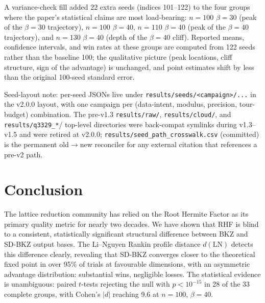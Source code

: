 \documentclass[journal=cic,version=preprint]{iacrj}
\begin{document}
A variance-check fill added 22 extra seeds (indices 101--122) to the four groups where the paper's statistical claims are most load-bearing: $n=100$ $\beta=30$ (peak of the $\beta=30$ trajectory), $n=100$ $\beta=40$, $n=110$ $\beta=40$ (peak of the $\beta=40$ trajectory), and $n=130$ $\beta=40$ (depth of the $\beta=40$ cliff). Reported means, confidence intervals, and win rates at these groups are computed from 122 seeds rather than the baseline 100; the qualitative picture (peak locations, cliff structure, sign of the advantage) is unchanged, and point estimates shift by less than the original 100-seed standard error.

Seed-layout note: per-seed JSONs live under \texttt{results/seeds/<campaign>/...} in the v2.0.0 layout, with one campaign per (data-intent, modulus, precision, tour-budget) combination. The pre-v1.3 \texttt{results/raw/}, \texttt{results/cloud/}, and \texttt{results/q3329\_*}/ top-level directories were back-compat symlinks during v1.3--v1.5 and were retired at v2.0.0; \texttt{results/seed\_path\_crosswalk.csv} (committed) is the permanent old$\to$new reconciler for any external citation that references a pre-v2 path.

\section{Conclusion}
\label{sec:conclusion}

The lattice reduction community has relied on the Root Hermite Factor as its primary quality metric for nearly two decades. We have shown that RHF is blind to a consistent, statistically significant structural difference between BKZ and SD-BKZ output bases. The Li--Nguyen Rankin profile distance $d(\mathrm{LN})$ detects this difference clearly, revealing that SD-BKZ converges closer to the theoretical fixed point in over 95\% of trials at favourable dimensions, with an asymmetric advantage distribution: substantial wins, negligible losses. The statistical evidence is unambiguous: paired $t$-tests rejecting the null with $p<10^{-15}$ in 28 of the 33 complete groups, with Cohen's $|d|$ reaching 9.6 at $n=100$, $\beta=40$.
\end{document}
